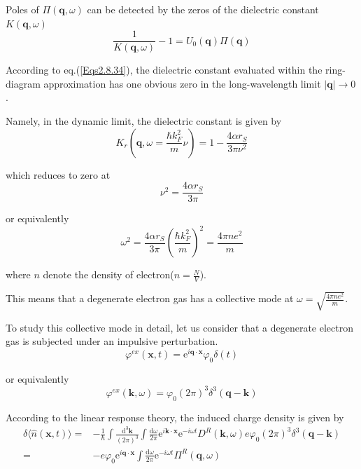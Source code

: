 Poles of $\Pi(\mathbf{q},\omega)$ can be detected by the zeros of the dielectric constant $K(\mathbf{q},\omega)$
\begin{equation} \label{Eqs3.2.1}
\frac{1}{K(\mathbf{q},\omega)} - 1 = U_0(\mathbf{q}) \Pi(\mathbf{q})
\end{equation}

According to eq.(\ref{Eqs2.8.34}), the dielectric constant evaluated within the ring-diagram approximation has one obvious zero in the long-wavelength limit $|\mathbf{q}| \rightarrow 0$.

Namely, in the dynamic limit, the dielectric constant is given by
\begin{equation*} \tag{2.8.34}
K_r(\mathbf{q},\omega = \frac{\hbar k_F^2}{m}\nu) = 1- \frac{4\alpha r_S}{3\pi \nu^2}
\end{equation*}

which reduces to zero at
\[\nu^2 = \frac{4\alpha r_S}{3\pi}\]

or equivalently
\begin{equation} \label{Eqs3.2.2}
\omega^2 = \frac{4\alpha r_S}{3\pi} \left( \frac{\hbar k_F^2}{m} \right)^2 = \frac{4\pi n e^2}{m}
\end{equation}

where $n$ denote the density of electron($n = \frac{N}{V}$).

This means that a degenerate electron gas has a collective mode at $\omega = \sqrt{\frac{4\pi n e^2}{m}}$.

To study this collective mode in detail, let us consider that a degenerate electron gas is subjected under an impulsive perturbation.
\begin{equation} \label{Eqs3.2.3}
\varphi^{ex}(\mathbf{x},t) = \mathrm{e}^{i \mathbf{q} \cdot \mathbf{x}} \varphi_0 \delta(t)
\end{equation}

or equivalently
\begin{equation*} \label{Eqs3.2.3'} \tag{3.2.3'}
\varphi^{ex}(\mathbf{k},\omega) = \varphi_0 (2\pi)^3 \delta^3(\mathbf{q}-\mathbf{k})
\end{equation*}

According to the linear response theory, the induced charge density is given by
\begin{equation} \label{Eqs3.2.4} \begin{split}
\delta \langle \hat{n}(\mathbf{x},t) \rangle =&-\frac{1}{\hbar} \int \frac{\mathrm{d}^3 \mathbf{k}}{(2\pi)^3} \int \frac{\mathrm{d}\omega}{2\pi} \mathrm{e}^{i \mathbf{k} \cdot \mathbf{x}} \mathrm{e}^{-i \omega t} D^R(\mathbf{k},\omega) e \varphi_0 (2\pi)^3 \delta^3(\mathbf{q}-\mathbf{k})\\
=& - e \varphi_0 \mathrm{e}^{i \mathbf{q} \cdot \mathbf{x}} \int \frac{\mathrm{d}\omega}{2\pi}\mathrm{e}^{-i \omega t} \Pi^R(\mathbf{q},\omega)
\end{split}\end{equation}

